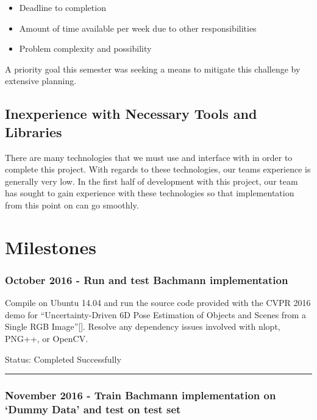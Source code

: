 \documentclass[12pt]{article}
\begin{document}
\begin{itemize}
\item
  Deadline to completion
\item
  Amount of time available per week due to other responsibilities
\item
  Problem complexity and possibility
\end{itemize}

A priority goal this semester was seeking a means to mitigate this
challenge by extensive planning.

\subsection{Inexperience with Necessary Tools and
Libraries}\label{inexperience-with-necessary-tools-and-libraries}

There are many technologies that we must use and interface with in order
to complete this project. With regards to these technologies, our teams
experience is generally very low. In the first half of development with
this project, our team has sought to gain experience with these
technologies so that implementation from this point on can go smoothly.

\section{Milestones}\label{milestones}

\subsubsection{October 2016 - Run and test Bachmann
implementation}\label{october-2016---run-and-test-bachmann-implementation}

Compile on Ubuntu 14.04 and run the source code provided with the CVPR
2016 demo for ``Uncertainty-Driven 6D Pose Estimation of Objects and
Scenes from a Single RGB Image''{[}{]}. Resolve any dependency issues
involved with nlopt, PNG++, or OpenCV.

Status: Completed Successfully

\begin{center}\rule{0.5\linewidth}{\linethickness}\end{center}

\subsubsection{\texorpdfstring{November 2016 - Train Bachmann
implementation on `Dummy Data' and test on test
set}{November 2016 - Train Bachmann implementation on Dummy Data and test on test set}}\label{november-2016---train-bachmann-implementation-on-dummy-data-and-test-on-test-set}
\end{document}
